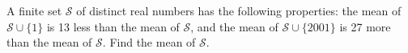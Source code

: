 A finite set $\mathcal{S}$ of distinct real numbers has the following properties: the mean of $\mathcal{S}\cup\{1\}$ is 13 less than the mean of $\mathcal{S}$, and the mean of $\mathcal{S}\cup\{2001\}$ is 27 more than the mean of $\mathcal{S}.$  Find the mean of $\mathcal{S}.$